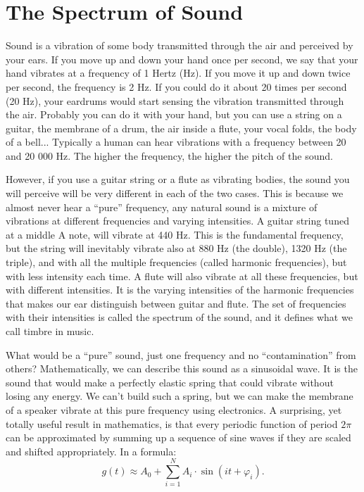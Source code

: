 \section{The Spectrum of Sound}

Sound is a vibration of some body transmitted through the air and perceived by your ears. If you move up and down your hand once per second, we say that your hand vibrates at a frequency of 1 Hertz (Hz). If you move it up and down twice per second, the frequency is 2 Hz. If you could do it about 20 times per second (20 Hz), your eardrums would start sensing the vibration transmitted through the air. Probably you can do it with your hand, but you can use a string on a guitar, the membrane of a drum, the air inside a flute, your vocal folds, the body of a bell... Typically a human can hear vibrations with a frequency between 20 and 20 000 Hz. The higher the frequency, the higher the pitch of the sound.

However, if you use a guitar string or a flute as vibrating bodies, the sound you will perceive will be very different in each of the two cases. This is because we almost never hear a ``pure'' frequency, any natural sound is a mixture of vibrations at different frequencies and varying intensities. A guitar string tuned at a middle A note, will vibrate at 440 Hz. This is the fundamental frequency, but the string will inevitably vibrate also at 880 Hz (the double), 1320 Hz (the triple), and with all the multiple frequencies (called harmonic frequencies), but with less intensity each time. A flute will also vibrate at all these frequencies, but with different intensities. It is the varying intensities of the harmonic frequencies that makes our ear distinguish between guitar and flute. The set of frequencies with their intensities is called the spectrum of the sound, and it defines what we call timbre in music.

What would be a ``pure'' sound, just one frequency and no ``contamination'' from others? Mathematically, we can describe this sound as a sinusoidal wave. It is the sound that would make a perfectly elastic spring that could vibrate without losing any energy. We can't build such a spring, but we can make the membrane of a speaker vibrate at this pure frequency using electronics. A surprising, yet totally useful result in mathematics, is that every periodic function of period $2\pi$ can be approximated by summing up a sequence of sine waves if they are scaled and shifted appropriately. In a formula: 
$$g(t) \approx A_0 + \sum_{i=1}^N A_i \cdot \sin(i t + \varphi_i).$$


